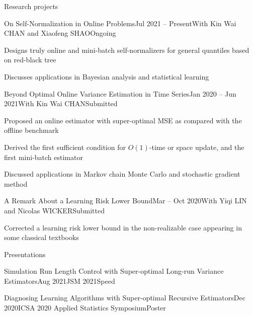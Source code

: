 \documentclass[10pt]{resume} %
\begin{document}
\begin{rSection}{Research projects}

\begin{rSubsection}{On Self-Normalization in Online Problems}{Jul 2021 -- Present}{With Kin Wai CHAN and Xiaofeng SHAO}{Ongoing}
\item Designs truly online and mini-batch self-normalizers for general quantiles based on red-black tree
\item Discusses applications in Bayesian analysis and statistical learning
\end{rSubsection}


\begin{rSubsection}{Beyond Optimal Online Variance
Estimation in Time Series}{Jan 2020 -- Jun 2021}{With Kin Wai CHAN}{Submitted}
\item Proposed an online estimator with super-optimal MSE as compared with the offline benchmark
\item Derived the first sufficient condition for $O(1)$-time or space update, and the first mini-batch estimator
\item Discussed applications in Markov chain Monte Carlo and stochastic gradient method
\end{rSubsection}


\begin{rSubsection}{A Remark About a Learning Risk Lower Bound}{Mar -- Oct 2020}{With Yiqi LIN and Nicolas WICKER}{Submitted}
  \item Corrected a learning risk lower bound in the non-realizable case appearing in some classical textbooks
\end{rSubsection}

\end{rSection}


\begin{rSection}{Presentations}

\begin{rSecitem}{Simulation Run Length Control with Super-optimal Long-run Variance Estimators}{Aug 2021}{JSM 2021}{Speed}
\end{rSecitem}

\begin{rSecitem}{Diagnosing Learning Algorithms with Super-optimal Recursive Estimators}{Dec 2020}{ICSA 2020 Applied Statistics Symposium}{Poster}
\end{rSecitem}

\end{rSection}
\end{document}
